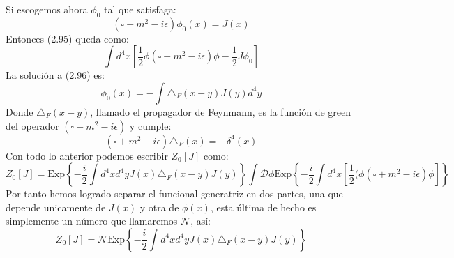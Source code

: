 Si escogemos ahora $\phi_0$ tal que satisfaga:
\begin{equation}
(\square+m^2-i\epsilon)\phi_0(x)=J(x)
\end{equation}
Entonces (2.95) queda como:
\begin{equation}
\int d^{4}x\left[\frac{1}{2}\phi(\square+m^{2}-i\epsilon)\phi-\frac{1}{2}J\phi_{0}\right]
\end{equation}
La solución a (2.96) es:
\begin{equation}
\phi_{0}(x)=-\int\triangle_{F}(x-y)J(y)d^{4}y
\end{equation}
Donde $\triangle_F(x-y)$, llamado el propagador de Feynmann, es la función de green del operador $(\square+m^2-i\epsilon)$ y cumple:
\begin{equation}
(\square+m^2-i\epsilon)\triangle_{F}(x)=-\delta^4(x)
\end{equation}
Con todo lo anterior podemos escribir $Z_0[J]$ como:
\begin{equation}
Z_0[J]=\text{Exp}\left\{ -\frac{i}{2}\int d^{4}xd^{4}yJ(x)\triangle_{F}(x-y)J(y)\right\} \int\mathcal{D}\phi\text{Exp}\left\{ -\frac{i}{2}\int d^{4}x\left[\frac{1}{2}(\phi(\square +m^{2}-i\epsilon)\phi\right]\right\} 
\end{equation}
Por tanto hemos logrado separar el funcional generatriz en dos partes, una que depende unicamente de $J(x)$ y otra de $\phi(x)$, esta última de hecho es simplemente un número que llamaremos $\mathcal{N}$, así:
\begin{equation}
Z_{0}[J]=\mathcal{N}\text{Exp}\left\{ -\frac{i}{2}\int d^{4}xd^{4}yJ(x)\triangle_{F}(x-y)J(y)\right\}
\end{equation}
